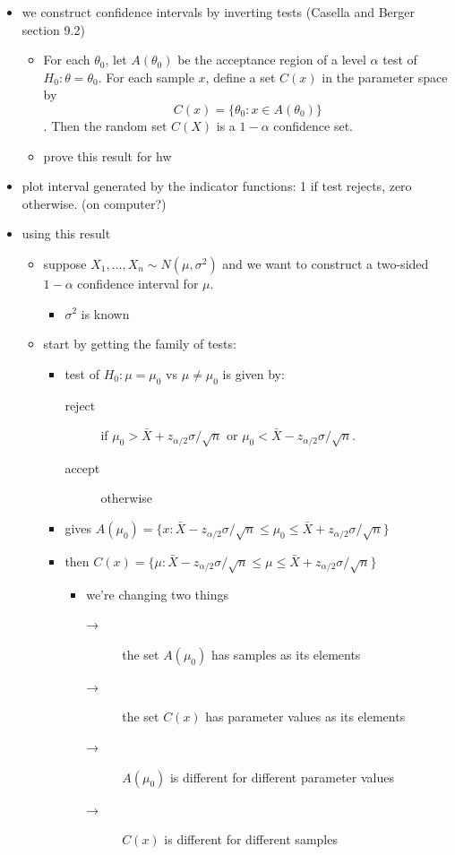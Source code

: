 \begin{itemize}
\item we construct confidence intervals by inverting tests (Casella and
      Berger section 9.2)
\begin{itemize}
\item For each $\theta_0$, let $A(\theta_0)$ be the acceptance region
        of a level $\alpha$ test of $H_0: \theta = \theta_0$.  For each
        sample $x$, define a set $C(x)$ in the parameter space
        by \[C(x) = \{\theta_0: x \in A(\theta_0)\}\].  Then the random
        set $C(X)$ is a $1-\alpha$ confidence set.
\item prove this result for hw
\end{itemize}
\item plot interval generated by the indicator functions: 1 if test
      rejects, zero otherwise. (on computer?)
\item using this result
\begin{itemize}
\item suppose $X_1,\dots,X_n \sim N(\mu,\sigma^2)$ and we want to
        construct a two-sided $1-\alpha$ confidence interval for $\mu$.
\begin{itemize}
\item $\sigma^2$ is known
\end{itemize}
\item start by getting the family of tests:
\begin{itemize}
\item test of $H_0: \mu = \mu_0$ vs $\mu \neq \mu_0$ is given by:
\begin{description}
\item[reject] if $\mu_0 > \bar X + z_{\alpha/2}
                      \sigma / \sqrt{n}$ or $\mu_0 < \bar X - 
                      z_{\alpha/2} \sigma / \sqrt{n}$.
\item[accept] otherwise
\end{description}
\item gives $A(\mu_0) = \{x :\bar X - z_{\alpha/2} \sigma /
          \sqrt{n} \leq \mu_0 \leq \bar X + z_{\alpha/2} \sigma /
          \sqrt{n}\}$
\item then $C(x) = \{\mu :\bar X - z_{\alpha/2}  \sigma /
          \sqrt{n} \leq \mu \leq \bar X + z_{\alpha/2} \sigma /
          \sqrt{n}\}$
\begin{itemize}
\item we're changing two things
\begin{description}
\item[→] the set $A(\mu_0)$ has samples as its elements
\item[→] the set $C(x)$ has parameter values as its elements
\item[→] $A(\mu_0)$ is different for different parameter values
\item[→] $C(x)$ is different for different samples
\end{description}
\end{itemize}
\end{itemize}
\end{itemize}
\end{itemize}
